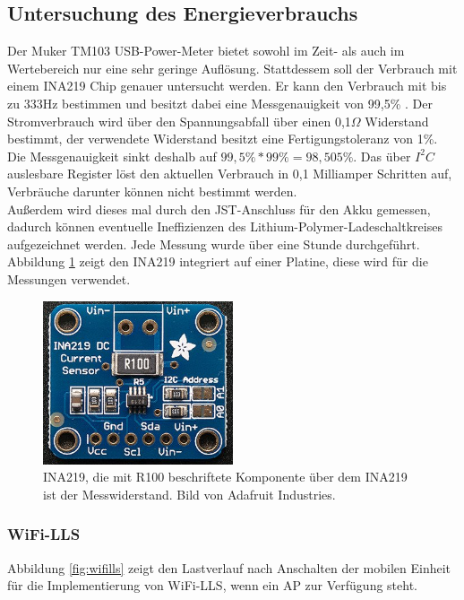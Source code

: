 \subsection{Untersuchung des Energieverbrauchs}
\label{ch:phase1:sec:energie}
Der Muker TM103 USB-Power-Meter bietet sowohl im Zeit- als auch im Wertebereich nur eine sehr geringe Auflösung.
Stattdessem soll der Verbrauch mit einem INA219 Chip genauer untersucht werden.
Er kann den Verbrauch mit bis zu 333Hz bestimmen und besitzt dabei eine Messgenauigkeit von 99,5\% \cite{texas2015ina}.
Der Stromverbrauch wird über den Spannungsabfall über einen 0,1$\Omega$ Widerstand bestimmt, der verwendete Widerstand besitzt eine Fertigungstoleranz von 1\%.
Die Messgenauigkeit sinkt deshalb auf $99,5\% * 99\% = 98,505\%$. 
Das über $I^2C$ auslesbare Register löst den aktuellen Verbrauch in 0,1 Milliamper Schritten auf, Verbräuche darunter können nicht bestimmt werden.\\
Außerdem wird dieses mal durch den JST-Anschluss für den Akku gemessen, dadurch können eventuelle Ineffizienzen des Lithium-Polymer-Ladeschaltkreises aufgezeichnet werden. 
Jede Messung wurde über eine Stunde durchgeführt.
Abbildung \ref{fig:ina219} zeigt den INA219 integriert auf einer Platine, diese wird für die Messungen verwendet.

\begin{figure}[h!]
  \centering
	\includegraphics[width=0.5\textwidth]{images/ina219ada.png}
  \caption{INA219, die mit R100 beschriftete Komponente über dem INA219 ist der Messwiderstand. Bild von Adafruit Industries.}
  \label{fig:ina219}
\end{figure}

\subsubsection{WiFi-LLS}
\label{ch:phase1:sec:powerwifills}
Abbildung \ref{fig:wifills} zeigt den Lastverlauf nach Anschalten der mobilen Einheit für die Implementierung von WiFi-LLS, wenn ein AP zur Verfügung steht. 

